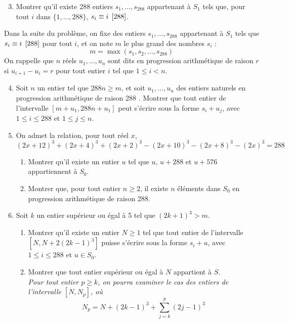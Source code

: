 \documentclass[landscape,twocolumn,leqno,a4paper,10pt]{report} %
\makeatletter
\renewcommand{\geq}{\geqslant}
\renewcommand{\leq}{\leqslant}
\newcommand{\Mod}[1]{\allowbreak\if@display\mkern5mu\else\mkern5mu\fi\left[#1\right]}	%
\makeatother
\begin{document}
\begin{enumerate}\setcounter{enumi}{2}
	\item Montrer qu'il existe 288 entiers $s_{1}, \ldots, s_{288}$ appartenant à $S_{1}$ tels que, pour tout $i$ dans $\{1, \ldots, 288\}$, $s_{i} \equiv i \Mod{288}$.
\end{enumerate}
Dans la suite du problème, on fixe des entiers $s_{1}, \ldots, s_{288}$ appartenant à $S_{1}$ tels que $s_{i} \equiv i\Mod{288}$ pour tout $i$, et on note $m$ le plus grand des nombres $s_{i}$ :
$$m=\max \left(s_{1}, s_{2}, \ldots, s_{288}\right)$$
On rappelle que $n$ réels $u_{1}, \ldots, u_{n}$ sont dits en progression arithmétique de raison $r$ si $u_{i+1}-u_{i}=r$ pour tout entier $i$ tel que $1 \leq i<n$.
\begin{enumerate}\setcounter{enumi}{3}
	\item Soit $n$ un entier tel que $288 n \geq m$, et soit $u_{1}, \ldots, u_{n}$ des entiers naturels en progression arithmétique de raison 288 . Montrer que tout entier de l'intervalle $\left[m+u_{1}, 288 n+u_{1}\right]$ peut s'écrire sous la forme $s_{i}+u_{j}$, avec $1 \leq i \leq 288$ et $1 \leq j \leq n$.
	\item On admet la relation, pour tout réel $x$,
	$$(2 x+12)^{3}+(2 x+4)^{3}+(2 x+2)^{3}-(2 x+10)^{3}-(2 x+8)^{3}-(2 x)^{3}=288$$
	\begin{enumerate}
		\item Montrer qu'il existe un entier $u$ tel que $u$, $u+288$ et $u+576$ appartiennent à $S_{0}$.
		\item Montrer que, pour tout entier $n \geq 2$, il existe $n$ éléments dans $S_{0}$ en progression arithmétique de raison 288.
	\end{enumerate}
	\item Soit $k$ un entier supérieur ou égal à 5 tel que $(2 k+1)^{3}>m$.
	\begin{enumerate}
		\item Montrer qu'il existe un entier $N \geq 1$ tel que tout entier de l'intervalle $\left[N, N+2(2 k-1)^{3}\right]$ puisse s'écrire sous la forme $s_{i}+u$, avec $1 \leq i \leq 288$ et $u \in S_{0}$.
		\item Montrer que tout entier supérieur ou égal à $N$ appartient à $S$.\\
		\textit{Pour tout entier $p \geq k$, on pourra examiner le cas des entiers de l'intervalle $\left[N, N_{p}\right]$, où}
		$$N_{p}=N+(2 k-1)^{3}+\sum_{j=k}^{p}(2 j-1)^{3}$$
	\end{enumerate}
\end{enumerate}
\end{document}
